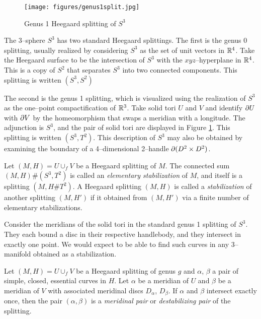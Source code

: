 \begin{figure}
		\centering
		\caption{Genus 1 Heegaard splitting of $S^3$}
		\texttt{[image: figures/genus1split.jpg]}
		\label{fig:genus1split}
\end{figure}

\begin{ex}
	The 3--sphere $S^3$ has two standard Heegaard splittings.
	The first is the genus 0 splitting, usually realized by considering $S^3$ as the set of unit vectors in $\mathbb{R}^4$.
	Take the Heegaard surface to be the intersection of $S^3$ with the $xyz$--hyperplane in $\mathbb{R}^4$.
	This is a copy of $S^2$ that separates $S^3$ into two connected components.
	This splitting is written $(S^3,S^2)$
	
	The second is the genus 1 splitting, which is visualized using the realization of $S^3$ as the one--point compactification of $\mathbb{R}^3$.
	Take solid tori $U$ and $V$ and identify $\partial U$ with $\partial V$ by the homeomorphism that swaps a meridian with a longitude.
	The adjunction is $S^3$, and the pair of solid tori are displayed in Figure \ref{fig:genus1split}.
	This splitting is written $(S^3,T^2)$.
	This description of $S^3$ may also be obtained by examining the boundary of a 4--dimensional 2--handle $\partial (D^2\times D^2)$.
\end{ex}

\begin{defn}
	Let $(M,H)=U\cup_f V$ be a Heegaard splitting of $M$.
	The connected sum $(M,H)\#(S^3,T^2)$ is called an \emph{elementary stabilization} of $M$, and itself is a splitting $(M,H\#T^2)$.
	A Heegaard splitting $(M,H)$ is called a \emph{stabilization} of another splitting $(M,H')$ if it obtained from $(M,H')$ via a finite number of elementary stabilizations.
\end{defn}

Consider the meridians of the solid tori in the standard genus 1 splitting of $S^3$.
They each bound a disc in their respective handlebody, and they intersect in exactly one point.
We would expect to be able to find such curves in any 3--manifold obtained as a stabilization.
	
\begin{defn}	
	Let $(M,H)=U\cup_f V$ be a Heegaard splitting of genus $g$ and $\alpha$, $\beta$ a pair of simple, closed, essential curves in $H$.
	Let $\alpha$ be a meridian of $U$ and $\beta$ be a meridian of $V$ with associated meridinal discs $D_\alpha$, $D_\beta$.
	If $\alpha$ and $\beta$ intersect exactly once, then the pair $(\alpha,\beta)$ is a \emph{meridinal pair} or \emph{destabilizing pair} of the splitting.
\end{defn}

